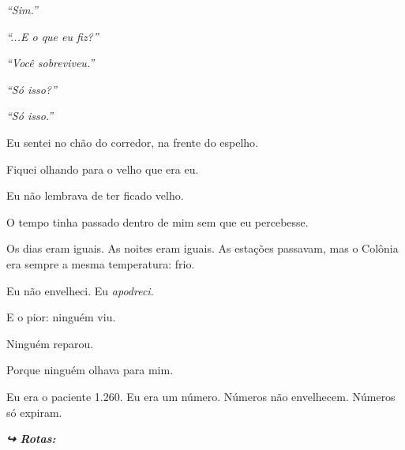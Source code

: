 \noindent \textit{\textquotedblleft{}Sim.\textquotedblright{}}

\noindent \textit{\textquotedblleft{}...E o que eu fiz?\textquotedblright{}}

\noindent \textit{\textquotedblleft{}Você sobreviveu.\textquotedblright{}}

\noindent \textit{\textquotedblleft{}Só isso?\textquotedblright{}}

\noindent \textit{\textquotedblleft{}Só isso.\textquotedblright{}}

\noindent Eu sentei no chão do corredor, na frente do espelho.

\noindent Fiquei olhando para o velho que era eu.

\noindent Eu não lembrava de ter ficado velho.

\noindent O tempo tinha passado dentro de mim sem que eu percebesse.

\noindent Os dias eram iguais. As noites eram iguais. As estações passavam, mas o Colônia era sempre a mesma temperatura: frio.

\noindent Eu não envelheci.
Eu \textit{apodreci}.

\noindent E o pior: ninguém viu.

\noindent Ninguém reparou.

\noindent Porque ninguém olhava para mim.

\noindent Eu era o paciente 1.260.
Eu era um número.
Números não envelhecem.
Números só expiram.

\vspace{0.5em}
\noindent\textit{\textbf{↪ Rotas:}  \rotasep {}}